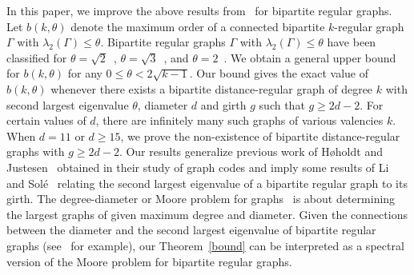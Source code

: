 In this paper, we improve the above results from~\cite{CKNV16} for bipartite regular graphs. Let $b(k,\theta)$ denote the maximum order of a connected bipartite $k$-regular graph $\Gamma$ with $\lambda_2(\Gamma) \leq \theta$. Bipartite regular graphs $\Gamma$ with $\lambda_2(\Gamma) \leq \theta$ have been classified for $\theta=\sqrt{2}$~\cite{TY00}, $\theta=\sqrt{3}$~\cite{KS13}, and $\theta=2$~\cite{KS14}. We obtain a general upper bound for $b(k,\theta)$ for any $0\leq \theta< 2\sqrt{k-1}$. Our bound gives the exact value of $b(k,\theta)$ whenever there exists a bipartite distance-regular graph of degree $k$ with second largest eigenvalue $\theta$, diameter $d$ and girth $g$ such that $g\geq 2d-2$. For certain values of $d$, there are infinitely many such graphs of various valencies $k$. When $d=11$ or $d\geq 15$, we prove the non-existence of bipartite distance-regular graphs with $g\geq 2d-2$. Our results generalize previous work of H\o holdt and Justesen~\cite{HJ14} obtained in their study of graph codes and imply some results of Li and Sol\'{e}~\cite{CLS96} relating the second largest eigenvalue of a bipartite regular graph to its girth. The degree-diameter or Moore problem for graphs~\cite{MS} is about determining the largest graphs of given maximum degree and diameter. Given the connections between the diameter and the second largest eigenvalue of bipartite regular graphs (see~\cite{Ch89} for example), our Theorem~\ref{bound} can be interpreted as a spectral version of the Moore problem for bipartite regular graphs. 
